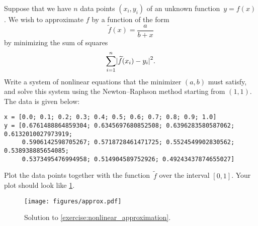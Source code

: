 \begin{exercise}
    \label{exercise:nonlinear_approximation}
    Suppose that we have $n$ data points $(x_i, y_i)$ of an unknown function~$y = f(x)$.
    We wish to approximate $f$ by a function of the form
    \[
        \widetilde f(x) = \frac{a}{b + x}
    \]
    by minimizing the sum of squares
    \[
        \sum_{i=1}^{n} \abs[big]{\widetilde f(x_i) - y_i}^2.
    \]
    Write a system of nonlinear equations that the minimizer $(a, b)$ must satisfy,
    and solve this system using the Newton--Raphson method starting from $(1, 1)$.
    The data is given below:
    \begin{verbatim}
x = [0.0; 0.1; 0.2; 0.3; 0.4; 0.5; 0.6; 0.7; 0.8; 0.9; 1.0]
y = [0.6761488864859304; 0.6345697680852508; 0.6396283580587062; 0.6132010027973919;
     0.5906142598705267; 0.5718728461471725; 0.5524549902830562; 0.538938885654085;
     0.5373495476994958; 0.514904589752926; 0.49243437874655027]
    \end{verbatim}
    Plot the data points together with the function~$\widetilde f$ over the interval $[0, 1]$.
    Your plot should look like \cref{fig:solution_exercise_approximation}.
    \begin{figure}[ht]
        \centering
        \texttt{[image: figures/approx.pdf]}
        \caption{Solution to \cref{exercise:nonlinear_approximation}.}%
        \label{fig:solution_exercise_approximation}
    \end{figure}
\end{exercise}

